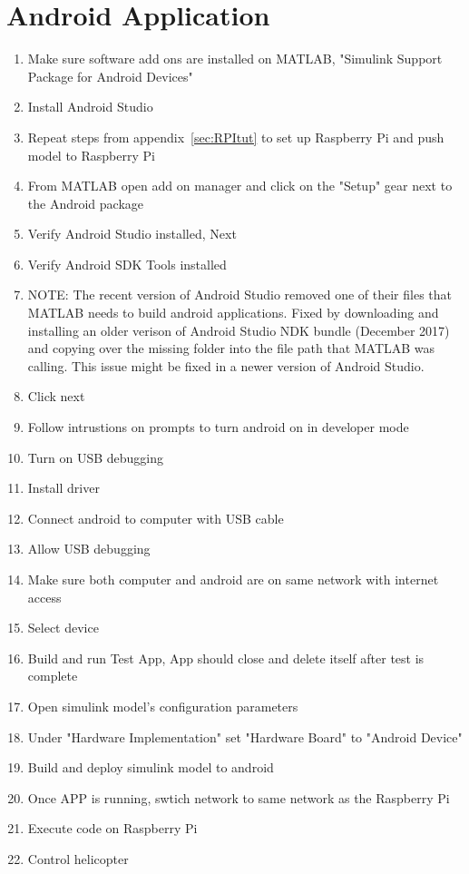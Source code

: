 \section{Android Application}
\label{sec:Androidtut}
\begin{enumerate}
    \item Make sure software add ons are installed on MATLAB, "Simulink Support Package for Android Devices"
    \item Install Android Studio
    \item Repeat steps from appendix~\ref{sec:RPItut} to set up Raspberry Pi and push model to Raspberry Pi
    \item From MATLAB open add on manager and click on the "Setup" gear next to the Android package
    \item Verify Android Studio installed, Next
    \item Verify Android SDK Tools installed
    \item NOTE: The recent version of Android Studio removed one of their files that MATLAB needs to build android applications.  Fixed by downloading and installing an older verison of Android Studio NDK bundle (December 2017) and copying over the missing folder into the file path that MATLAB was calling.  This issue might be fixed in a newer version of Android Studio. 
    \item Click next
    \item Follow intrustions on prompts to turn android on in developer mode
    \item Turn on USB debugging
    \item Install driver
    \item Connect android to computer with USB cable
    \item Allow USB debugging
    \item Make sure both computer and android are on same network with internet access
    \item Select device
    \item Build and run Test App, App should close and delete itself after test is complete
    \item Open simulink model's configuration parameters
    \item Under "Hardware Implementation" set "Hardware Board" to "Android Device"
    \item Build and deploy simulink model to android
    \item Once APP is running, swtich network to same network as the Raspberry Pi
    \item Execute code on Raspberry Pi
    \item Control helicopter
\end{enumerate}

